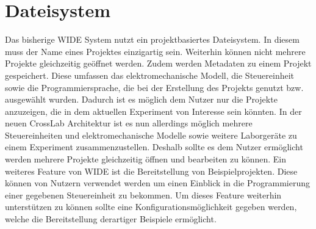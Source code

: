 \section{Dateisystem}\label{section:konzeption:dateisystem}

Das bisherige WIDE System nutzt ein projektbasiertes Dateisystem. In diesem muss der Name eines Projektes einzigartig sein. Weiterhin können nicht mehrere Projekte gleichzeitig geöffnet werden. Zudem werden Metadaten zu einem Projekt gespeichert. Diese umfassen das elektromechanische Modell, die Steuereinheit sowie die Programmiersprache, die bei der Erstellung des Projekts genutzt bzw. ausgewählt wurden. Dadurch ist es möglich dem Nutzer nur die Projekte anzuzeigen, die in dem aktuellen Experiment von Interesse sein könnten. In der neuen CrossLab Architektur ist es nun allerdings möglich mehrere Steuereinheiten und elektromechanische Modelle sowie weitere Laborgeräte zu einem Experiment zusammenzustellen. Deshalb sollte es dem Nutzer ermöglicht werden mehrere Projekte gleichzeitig öffnen und bearbeiten zu können. Ein weiteres Feature von WIDE ist die Bereitstellung von Beispielprojekten. Diese können von Nutzern verwendet werden um einen Einblick in die Programmierung einer gegebenen Steuereinheit zu bekommen. Um dieses Feature weiterhin unterstützen zu können sollte eine Konfigurationsmöglichkeit gegeben werden, welche die Bereitstellung derartiger Beispiele ermöglicht.